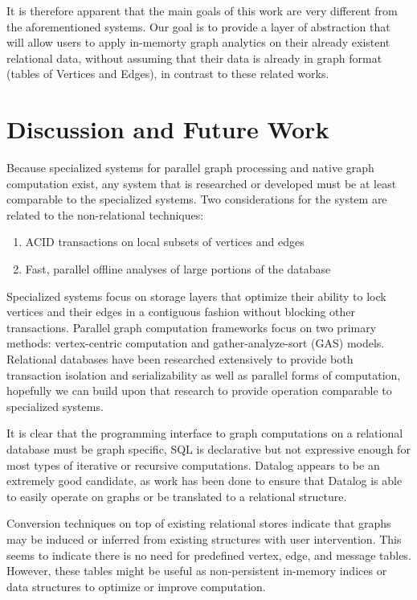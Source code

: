 \documentclass[11pt,letterpaper]{article}
\begin{document}
It is therefore apparent that the main goals of this work are very different from the aforementioned systems. Our goal is to provide a layer of abstraction that will allow users to apply in-memorty graph analytics on their already existent relational data, without assuming that their data is already in graph format (tables of Vertices and Edges), in contrast to these related works.

\section*{Discussion and Future Work}

Because specialized systems for parallel graph processing and native graph computation exist, any system that is researched or developed must be at least comparable to the specialized systems. Two considerations for the system are related to the non-relational techniques:

\begin{enumerate}
	\item ACID transactions on local subsets of vertices and edges
	\item Fast, parallel offline analyses of large portions of the database
\end{enumerate}

Specialized systems focus on storage layers that optimize their ability to lock vertices and their edges in a contiguous fashion without blocking other transactions. Parallel graph computation frameworks focus on two primary methods: vertex-centric computation and gather-analyze-sort (GAS) models. Relational databases have been researched extensively to provide both transaction isolation and serializability as well as parallel forms of computation, hopefully we can build upon that research to provide operation comparable to specialized systems.

It is clear that the programming interface to graph computations on a relational database must be graph specific, SQL is declarative but not expressive enough for most types of iterative or recursive computations. Datalog appears to be an extremely good candidate, as work has been done to ensure that Datalog is able to easily operate on graphs or be translated to a relational structure.

Conversion techniques on top of existing relational stores indicate that graphs may be induced or inferred from existing structures with user intervention. This seems to indicate there is no need for predefined vertex, edge, and message tables. However, these tables might be useful as non-persistent in-memory indices or data structures to optimize or improve computation.
\end{document}
